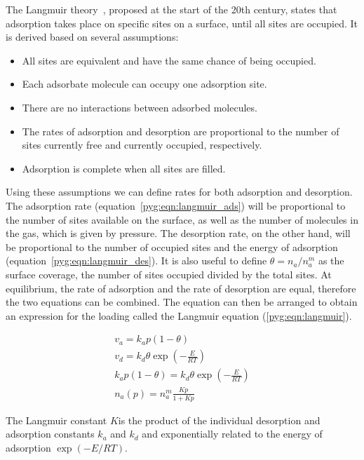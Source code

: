 The Langmuir theory~\cite{langmuirAdsorptionGasesPlane1918a},
proposed at the start of the 20th century, states that
adsorption takes place on specific sites on a surface, until
all sites are occupied.
It is derived based on several assumptions:

\begin{itemize}

	\item All sites are equivalent and have the same chance of
	      being occupied.
	\item Each adsorbate molecule can occupy one adsorption site.
	\item There are no interactions between adsorbed molecules.
	\item The rates of adsorption and desorption are proportional
	      to the number
	      of sites currently free and currently occupied,
	      respectively.
	\item Adsorption is complete when all sites are filled.

\end{itemize}

Using these assumptions we can define rates for both adsorption and
desorption. The adsorption rate (equation~\ref{pyg:eqn:langmuir_ads})
will be proportional to the number of sites available on the surface,
as well as the number of molecules in the gas, which is given by
pressure.
The desorption rate, on the other hand, will be proportional to the
number of occupied sites and the energy of adsorption
(equation~\ref{pyg:eqn:langmuir_des}).
It is also useful to define \(\theta = n_a/n_a^m\) as the surface
coverage,
the number of sites occupied divided by the total sites. At
equilibrium,
the rate of adsorption and the rate of
desorption are equal, therefore the two equations can be combined.
The equation can then be arranged to obtain an expression for the
loading called the Langmuir equation (\ref{pyg:eqn:langmuir}).

\begin{gather}
	v_a = k_a p (1 - \theta) \label{pyg:eqn:langmuir_ads} \\
	v_d = k_d \theta \exp{(-\frac{E}{RT})}
	\label{pyg:eqn:langmuir_des} \\
	k_a p (1 - \theta) = k_d \theta \exp{(-\frac{E}{RT})} \\
	n_a(p) = n_a^m \frac{Kp}{1+Kp} \label{pyg:eqn:langmuir}
\end{gather}

The Langmuir constant \(K\)is the product of the individual
desorption
and adsorption constants \(k_a\) and \(k_d\) and exponentially
related to the energy of adsorption \(\exp{(-{E}/{RT})}\).


